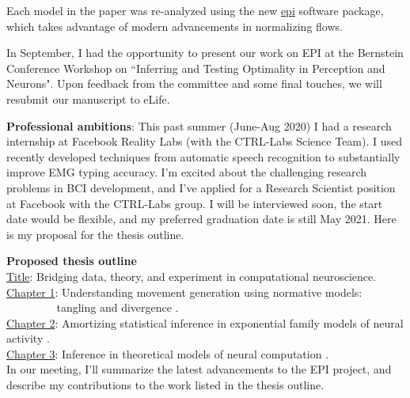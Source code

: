 \documentclass[11pt]{article}
\begin{document}
Each model in the paper was re-analyzed using the new {\color{blue} \href{https://github.com/cunningham-lab/epi}{epi} software package}, which takes advantage of modern advancements in normalizing flows.

In September, I had the opportunity to present our work on EPI at the Bernstein Conference Workshop on ``Inferring and Testing Optimality in Perception and Neurons".
Upon feedback from the committee and some final touches, we will resubmit our manuscript to eLife.

\textbf{Professional ambitions}:
This past summer (June-Aug 2020) I had a research internship at Facebook Reality Labs (with the CTRL-Labs Science Team).
I used recently developed techniques from automatic speech recognition to substantially improve EMG typing accuracy.
I'm excited about the challenging research problems in BCI development, and I've applied for a Research Scientist position at Facebook with the CTRL-Labs group.
I will be interviewed soon, the start date would be flexible, and my preferred graduation date is still May 2021.
Here is my proposal for the thesis outline.

\textbf{Proposed thesis outline} \\
\underline{Title}: Bridging data, theory, and experiment in computational neuroscience. \\
\underline{Chapter 1}: Understanding movement generation using normative models: \\ 
$~~~~~~~~~~~~~~~~~~~$ tangling \cite{russo2018motor} and divergence \cite{russo2020neural}. \\
\underline{Chapter 2}: Amortizing statistical inference in exponential family models of neural activity \cite{bittner2019approximating}. \\
\underline{Chapter 3}: Inference in theoretical models of neural computation \cite{bittner2019interrogating}. \\

In our meeting, I'll summarize the latest advancements to the EPI project, and describe my contributions to the work listed in the thesis outline.



\vspace{3mm}
\end{document}
